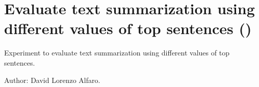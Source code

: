 \documentclass[letterpaper,10pt,english]{sphinxmanual}
\begin{document}
\section{Evaluate text summarization using different values of  top sentences ()}
\label{\detokenize{code:module-experiment_text_summarization}}\label{\detokenize{code:evaluate-text-summarization-using-different-values-of-k-top-sentences-experiment-text-summarization-py}}
Experiment to evaluate text summarization using different values of  top
sentences.

Author: David Lorenzo Alfaro.
\end{document}
